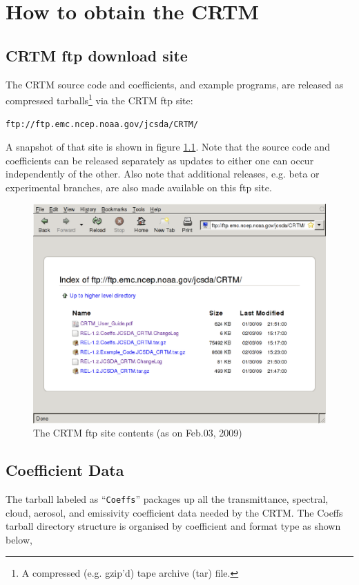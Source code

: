 \chapter{How to obtain the CRTM}

\section{CRTM ftp download site}
The CRTM source code and coefficients, and example programs, are released as compressed tarballs\footnote{A compressed (e.g. gzip'd) tape archive (tar) file.} via the CRTM ftp site:

\hspace{1cm}\texttt{ftp://ftp.emc.ncep.noaa.gov/jcsda/CRTM/}

A snapshot of that site is shown in figure \ref{fig:ftp_site}. Note that the source code and coefficients can be released separately as updates to either one can occur independently of the other. Also note that additional releases, e.g. beta or experimental branches, are also made available on this ftp site.

\begin{figure}[htb]
  \centering
  \includegraphics[scale=0.5]{graphics/Get/CRTM_ftp_site.eps}
  \caption{The CRTM ftp site contents (as on Feb.03, 2009)}
  \label{fig:ftp_site}
\end{figure}

\section{Coefficient Data}
The tarball labeled as ``\texttt{Coeffs}'' packages up all the transmittance, spectral, cloud, aerosol, and emissivity coefficient data needed by the CRTM. The Coeffs tarball directory structure is organised by coefficient and format type as shown below,

